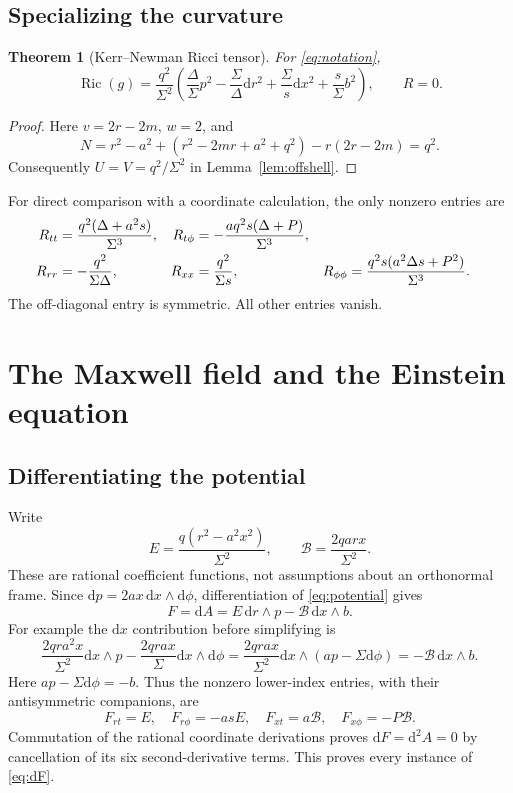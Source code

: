 \documentclass[11pt,a4paper]{article}
\numberwithin{equation}{section}
\newtheorem{theorem}{Theorem}[section]
\theoremstyle{definition}\newtheorem{definition}[theorem]{Definition}
\theoremstyle{remark}\newtheorem{remark}[theorem]{Remark}
\newcommand{\Ric}{\operatorname{Ric}}
\newcommand{\dd}{\mathrm{d}}
\newcommand{\calB}{\mathcal{B}}
\begin{document}
\subsection{Specializing the curvature}
\begin{theorem}[Kerr--Newman Ricci tensor]\label{thm:KN}
For \eqref{eq:notation},
\begin{equation}\label{eq:RicKN}
 \Ric(g)=\frac{q^2}{\Sigma^2}
 \left(\frac\Delta\Sigma p^2-\frac\Sigma\Delta\dd r^2
       +\frac\Sigma s\dd x^2+\frac s\Sigma b^2\right),\qquad R=0.
\end{equation}
\end{theorem}
\begin{proof}
Here $v=2r-2m$, $w=2$, and
\[
 N=r^2-a^2+(r^2-2mr+a^2+q^2)-r(2r-2m)=q^2.
\]
Consequently $U=V=q^2/\Sigma^2$ in Lemma~\ref{lem:offshell}.
\end{proof}
For direct comparison with a coordinate calculation, the only nonzero entries are
\begin{align}
 R_{tt}&=\frac{q^2(\Delta+a^2s)}{\Sigma^3},&
 R_{t\phi}&=-\frac{aq^2s(\Delta+P)}{\Sigma^3},\notag\\
 R_{rr}&=-\frac{q^2}{\Sigma\Delta},&R_{xx}&=\frac{q^2}{\Sigma s},&
 R_{\phi\phi}&=\frac{q^2s(a^2\Delta s+P^2)}{\Sigma^3}.\label{eq:Ric-table}
\end{align}
The off-diagonal entry is symmetric. All other entries vanish.

\section{The Maxwell field and the Einstein equation}\label{sec:maxwell}

\subsection{Differentiating the potential}
Write
\begin{equation}\label{eq:EB}
 E=\frac{q(r^2-a^2x^2)}{\Sigma^2},\qquad
 \calB=\frac{2qarx}{\Sigma^2}.
\end{equation}
These are rational coefficient functions, not assumptions about an orthonormal frame. Since $\dd p=2ax\,\dd x\wedge\dd\phi$, differentiation of \eqref{eq:potential} gives
\begin{equation}\label{eq:Fcoframe}
 F=\dd A=E\,\dd r\wedge p-\calB\,\dd x\wedge b.
\end{equation}
For example the $\dd x$ contribution before simplifying is
\[
 \frac{2qra^2x}{\Sigma^2}\dd x\wedge p
 -\frac{2qrax}{\Sigma}\dd x\wedge\dd\phi
 =\frac{2qrax}{\Sigma^2}\dd x\wedge(ap-\Sigma\dd\phi)
 =-\calB\,\dd x\wedge b.
\]
Here $ap-\Sigma\dd\phi=-b$. Thus the nonzero lower-index entries, with their antisymmetric companions, are
\begin{equation}\label{eq:Ftable}
 F_{rt}=E,\quad F_{r\phi}=-asE,\quad
 F_{xt}=a\calB,\quad F_{x\phi}=-P\calB.
\end{equation}
Commutation of the rational coordinate derivations proves $\dd F=\dd^2 A=0$ by cancellation of its six second-derivative terms. This proves every instance of \eqref{eq:dF}.
\end{document}
